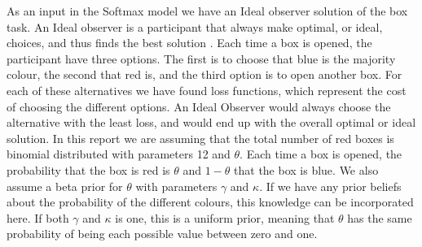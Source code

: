 As an input in the Softmax model we have an Ideal observer solution of the box task. An Ideal observer is a participant that always make optimal, or ideal, choices, and thus finds the best solution \citep{idealObs}. Each time a box is opened, the participant have three options. The first is to choose that blue is the majority colour, the second that red is, and the third option is to open another box. For each of these alternatives we have found loss functions, which represent the cost of choosing the different options. An Ideal Observer would always choose the alternative with the least loss, and would end up with the overall optimal or ideal solution. In this report we are assuming that the total number of red boxes is binomial distributed with parameters 12 and $\theta$. Each time a box is opened, the probability that the box is red is $\theta$ and $1-\theta$ that the box is blue. We also assume a beta prior for $\theta$ with parameters $\gamma$ and $\kappa$. If we have any prior beliefs about the probability of the different colours, this knowledge can be incorporated here. If both $\gamma$ and $\kappa$ is one, this is a uniform prior, meaning that $\theta$ has the same probability of being each possible value between zero and one. 










